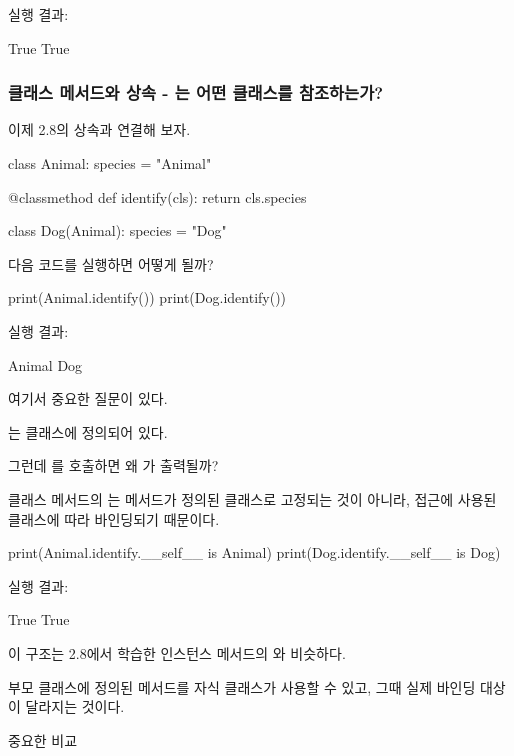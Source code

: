 실행 결과:

\begin{dhkzsh}
True
True
\end{dhkzsh}

\subsubsection{클래스 메서드와 상속 - 는 어떤 클래스를 참조하는가?}

이제 2.8의 상속과 연결해 보자.

\begin{dhkcode}
class Animal:
    species = "Animal"

    @classmethod
    def identify(cls):
        return cls.species


class Dog(Animal):
    species = "Dog"
\end{dhkcode}

다음 코드를 실행하면 어떻게 될까?

\begin{dhkcode}
print(Animal.identify())
print(Dog.identify())
\end{dhkcode}

실행 결과:

\begin{dhkzsh}
Animal
Dog
\end{dhkzsh}

여기서 중요한 질문이 있다.

는  클래스에 정의되어 있다.

그런데 를 호출하면 왜 가 출력될까?

클래스 메서드의 는 메서드가 정의된 클래스로 고정되는 것이 아니라, 접근에 사용된 클래스에 따라 바인딩되기 때문이다.

\begin{dhkcode}
print(Animal.identify.__self__ is Animal)
print(Dog.identify.__self__ is Dog)
\end{dhkcode}

실행 결과:

\begin{dhkzsh}
True
True
\end{dhkzsh}

이 구조는 2.8에서 학습한 인스턴스 메서드의 와 비슷하다.

부모 클래스에 정의된 메서드를 자식 클래스가 사용할 수 있고, 그때 실제 바인딩 대상이 달라지는 것이다.

\begin{dhknote}
\begin{dhksmry}[centered]
중요한 비교
\end{dhksmry}
\end{dhknote}

